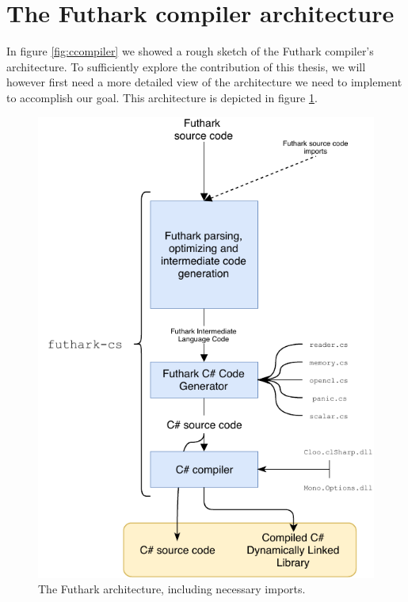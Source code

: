 \clearpage

\section{The Futhark \csharp{} compiler architecture}
In figure \ref{fig:ccompiler} we showed a rough sketch of the
Futhark compiler's architecture. To sufficiently explore the contribution of
this thesis, we will however first need a more detailed view of the architecture
we need to implement to accomplish our goal.
This architecture is depicted in figure \ref{fig:futharkcompilerlowerlevel}.

\begin{figure}[H]
  \centering
  \includegraphics[scale=0.85]{chapters/figs/csharp/futharkcsarchitecture.pdf}
  \caption{The Futhark \csharp{} architecture, including necessary imports.}
  \label{fig:futharkcompilerlowerlevel}
\end{figure}

